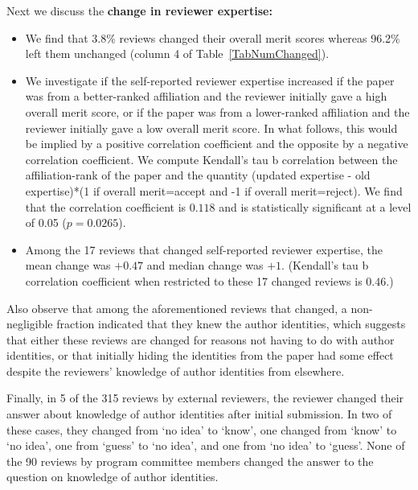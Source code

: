 \documentclass{article}
\newcommand{\rev}[1]{{\color{black}#1}}
\begin{document}
\rev{Next we discuss the {\bf change in reviewer expertise:}
\begin{itemize} 
\item We find that 3.8\% reviews changed their overall merit scores whereas 96.2\% left them unchanged (column 4 of Table~\ref{TabNumChanged}). 
\item We investigate if the self-reported reviewer expertise increased if the paper was from a better-ranked affiliation and the reviewer initially gave a high overall merit score, or if the paper was from a lower-ranked affiliation and the reviewer initially gave a low overall merit score. In what follows, this would be implied by a positive correlation coefficient and the opposite by a negative correlation coefficient. We compute Kendall's tau b correlation between the affiliation-rank of the paper and the quantity (updated expertise - old expertise)*(1 if overall merit=accept and -1 if overall merit=reject). We find that the correlation coefficient is $0.118$ and is statistically significant at a level of 0.05 ($p = 0.0265$). 
\item Among the 17 reviews that changed self-reported reviewer expertise, the mean change was $+0.47$ and median change was $+1$. (Kendall's tau b correlation coefficient when restricted to these 17 changed reviews is $0.46$.)
\end{itemize}
}

Also observe that among the aforementioned reviews that changed, a non-negligible fraction indicated that they knew the author identities, which suggests that either these reviews are changed for reasons not having to do with author identities, or that initially hiding the identities from the paper had some effect despite the reviewers' knowledge of author identities from elsewhere.

Finally, in 5 of the 315 reviews by external reviewers, the reviewer changed their answer about knowledge of author identities after initial submission. In two of these cases, they changed from `no idea' to `know', one changed from `know' to `no idea', one from `guess' to `no idea', and one from `no idea' to `guess'. None of the 90 reviews by program committee members changed the answer to the question on knowledge of author identities.
\end{document}
